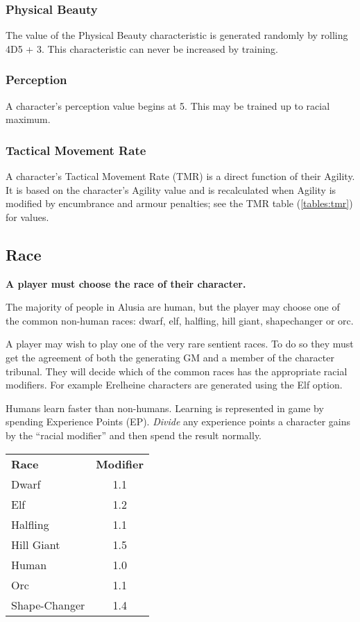 \begin{multicols*}{3}
\subsubsection{Physical Beauty}

The value of the Physical Beauty characteristic is generated randomly
by rolling 4D5 + 3. This characteristic can never be increased by
training.

\subsubsection{Perception}

A character's perception value begins at 5. This may be trained up to
racial maximum.

\subsubsection{Tactical Movement Rate}

A character's Tactical Movement Rate (TMR) is a direct function of
their Agility. It is based on the character's Agility value and is
recalculated when Agility is modified by encumbrance and armour
penalties; see the TMR table (\ref{tables:tmr}) for values.

\subsection{Race}
\label{chargen:race}

\textbf{A player must choose the race of their character.}

The majority of people in Alusia are human, but the player may choose
one of the common non-human races: dwarf, elf, halfling, hill giant,
shapechanger or orc.

A player may wish to play one of the very rare sentient races.  To do
so they must get the agreement of both the generating GM and a member
of the character tribunal.  They will decide which of the common races
has the appropriate racial modifiers.  For example Erelheine
characters are generated using the Elf option.

Humans learn faster than non-humans.  Learning is represented in game
by spending Experience Points (EP). \emph{Divide} any experience
points a character gains by the ``racial modifier'' and then spend the
result normally.

\begin{tabular}{lc}
\textbf{Race}	& \textbf{Modifier} \\
Dwarf		& 1.1 \\
Elf		& 1.2 \\
Halfling	& 1.1 \\
Hill Giant	& 1.5 \\
Human		& 1.0 \\
Orc		& 1.1 \\
Shape-Changer	& 1.4 \\
\end{tabular}


\end{multicols*}
